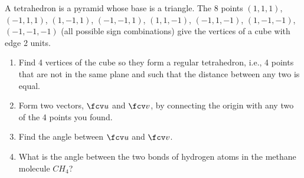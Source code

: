 A tetrahedron is a pyramid whose base is a triangle. The 8 points $(1,1,1)$, $(-1,1,1)$, $(1,-1,1)$, $(-1,-1,1)$, $(1,1,-1)$, $(-1,1,-1)$, $(1,-1,-1)$, $(-1,-1,-1)$ (all possible sign combinations) give the vertices of a cube with edge 2 units. 

\begin{enumerate}
\item Find 4 vertices of the cube so they form a regular tetrahedron, i.e., 4 points that are not in the same plane and such that the distance between any two is equal.
\item Form two vectors, $\fcv u$ and $\fcv v$, by connecting the origin with any two of the 4 points you found.
\item Find the angle between $\fcv u$ and $\fcv v$.
\item What is the angle between the two bonds of hydrogen atoms in the methane molecule $CH_4$?
\end{enumerate}